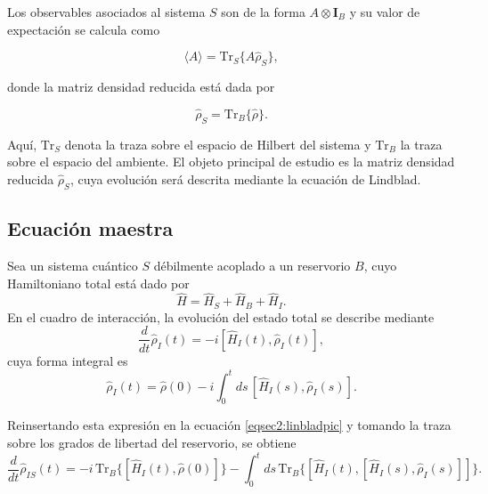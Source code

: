 Los observables asociados al sistema $S$ son de la forma $A\otimes \mathbf{I}_{B}$ y su valor de expectación se calcula como

\begin{equation*}
    \langle A \rangle = \text{Tr}_{S}\{A \hat{\rho}_{S} \},
\end{equation*}

donde la matriz densidad reducida está dada por

\begin{equation*}
    \hat{\rho}_{S} = \text{Tr}_{B}\{ \hat{\rho} \}.
\end{equation*}

Aquí, $\text{Tr}_{S}$ denota la traza sobre el espacio de Hilbert del sistema y $\text{Tr}_{B}$ la traza sobre el espacio del ambiente. El objeto principal de estudio es la matriz densidad reducida $\hat{\rho}_{S}$, cuya evolución será descrita mediante la ecuación de Lindblad.

\subsection{Ecuación maestra}
Sea un sistema cuántico $S$ débilmente acoplado a un reservorio $B$, cuyo Hamiltoniano total está dado por
\begin{equation*}
    \hat{H} = \hat{H}_{S} + \hat{H}_{B} + \hat{H}_{I}.
\end{equation*}
En el cuadro de interacción, la evolución del estado total se describe mediante
\begin{equation}
    \frac{d}{dt}\hat{\rho}_{I}(t) = -i[\hat{H}_{I}(t), \hat{\rho}_{I}(t)],
    \label{eqsec2:linbladpic}
\end{equation}
cuya forma integral es
\begin{equation*}
    \hat{\rho}_{I}(t) = \hat{\rho}(0) - i \int_{0}^{t} ds \,[\hat{H}_{I}(s), \hat{\rho}_{I}(s)].
\end{equation*}

Reinsertando esta expresión en la ecuación \eqref{eqsec2:linbladpic} y tomando la traza sobre los grados de libertad del reservorio, se obtiene
\begin{equation}
    \frac{d}{dt}\hat{\rho}_{IS}(t) = -i \,\text{Tr}_{B}\{[\hat{H}_{I}(t), \hat{\rho}(0)] \}  
    - \int_{0}^{t} ds \,\text{Tr}_{B}\{[\hat{H}_{I}(t), [\hat{H}_{I}(s), \hat{\rho}_{I}(s)]]\}.
\label{eqsec2:linbladpic2}
\end{equation}

